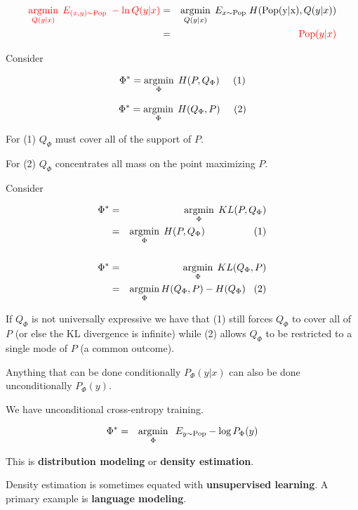 {\begin{eqnarray*}
  {\color{red} \operatorname*{argmin}_{Q(y|x)}\;E_{(x,y)\sim \mathrm{Pop}}\;-\ln Q(y|x)} & = & \operatorname*{argmin}_{Q(y|x)}\;E_{x \sim \mathrm{Pop}}\; H(\mathrm{Pop(y|x)}, Q(y|x)) \\
  & = & {\color{red} \mathrm{Pop}(y|x)} \\
\end{eqnarray*}
    
Consider 


$$\Phi^* = \operatorname*{argmin}_\Phi \;H(P,Q_\Phi)\;\;\;\;\;(1)$$

\vfill
$$\Phi^* = \operatorname*{argmin}_\Phi \;H(Q_\Phi,P)\;\;\;\;\;(2)$$

\vfill
For (1) $Q_\Phi$ must cover all of the support of $P$.

\vfill
For (2) $Q_\Phi$ concentrates all mass on the point maximizing $P$.

    
Consider 


\begin{eqnarray*}
  \Phi^* & = & \operatorname*{argmin}_\Phi \;KL(P,Q_\Phi) \\
  & = & \operatorname*{argmin}_\Phi\; H(P,Q_\Phi)\;\;\;\;\;\;\;\;\;\;\;\;\;\;\;\;\;\;(1) \\
  \\
  \Phi^* & = & \operatorname*{argmin}_\Phi \;KL(Q_\Phi,P) \\
  & = & \operatorname*{argmin}_\Phi H(Q_\Phi,P) - H(Q_\Phi)\;\;\;(2)
  \end{eqnarray*}

\vfill
If $Q_\Phi$ is not universally expressive we have that (1) still forces $Q_\Phi$ to cover all of $P$ (or else the KL divergence is infinite)
while (2) allows $Q_\Phi$ to be restricted to a single mode of $P$ (a common outcome).


Anything that can be done conditionally $P_\Phi(y|x)$ can also be done unconditionally $P_\Phi(y)$.

\vfill
We have unconditional cross-entropy training.

\begin{eqnarray*}
  \Phi^* & = & \operatorname*{argmin}_\Phi \;\;E_{y \sim \mathrm{Pop}}  -\log P_\Phi(y)
\end{eqnarray*}

\vfill
This is {\bf distribution modeling} or {\bf density estimation}.

\vfill
Density estimation is sometimes equated with {\bf unsupervised learning}.  A primary example is {\bf language modeling}.

}
